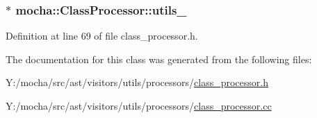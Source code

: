 \hypertarget{classmocha_1_1_class_processor_ad51b7e60254b3eeaea78992996d00bcd}{
\subsubsection[{utils\_\-}]{$\ast$ {\bf mocha::ClassProcessor::utils\_\-}}}
\label{classmocha_1_1_class_processor_ad51b7e60254b3eeaea78992996d00bcd}


Definition at line 69 of file class\_\-processor.h.



The documentation for this class was generated from the following files:\begin{DoxyCompactItemize}
\item 
Y:/mocha/src/ast/visitors/utils/processors/\hyperlink{class__processor_8h}{class\_\-processor.h}\item 
Y:/mocha/src/ast/visitors/utils/processors/\hyperlink{class__processor_8cc}{class\_\-processor.cc}\end{DoxyCompactItemize}

